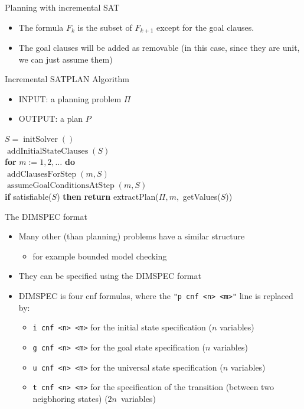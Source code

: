 \documentclass[t]{sdqbeamer}
\begin{document}
\begin{frame}{Planning with incremental SAT}
\begin{itemize}
\item The formula $F_k$ is the subset of $F_{k+1}$ except for the goal clauses.
\item The goal clauses will be added as removable (in this case, since they are unit, we can just assume
them)
\end{itemize}
\begin{block}{Incremental SATPLAN Algorithm}
\begin{itemize}
	\item INPUT: a planning problem $\Pi$
	\item OUTPUT: a plan $P$
\end{itemize}
$S = \operatorname{initSolver}()$ \\
$\operatorname{addInitialStateClauses}(S)$\\
\textbf{for} $m:=1,2,\dots$ \textbf{do}\\
\hspace{1em} $\operatorname{addClausesForStep}(m, S)$\\
\hspace{1em} $\operatorname{assumeGoalConditionsAtStep}(m, S)$\\
\hspace{1em} \textbf{if} satisfiable($S$) \textbf{then} \textbf{return} extractPlan($\Pi,m,$ getValues($S$))\\
\end{block}
\end{frame}

\begin{frame}{The DIMSPEC format}
\begin{itemize}
	\item Many other (than planning) problems have a similar structure
	\begin{itemize}
	\item for example bounded model checking
	\end{itemize}
	\item They can be specified using the DIMSPEC format
	\item DIMSPEC is four cnf formulas, where the \texttt{"p cnf <n> <m>"} line is replaced by:
	\begin{itemize}
	\item \texttt{i cnf <n> <m>} for the initial state specification ($n$ variables)
	\item \texttt{g cnf <n> <m>} for the goal state specification ($n$ variables)
	\item \texttt{u cnf <n> <m>} for the universal state specification ($n$ variables)
	\item \texttt{t cnf <n> <m>} for the specification of the transition (between two neigbhoring states) ($2n$~variables)
	\end{itemize}
\end{itemize}
\end{frame}
\end{document}
